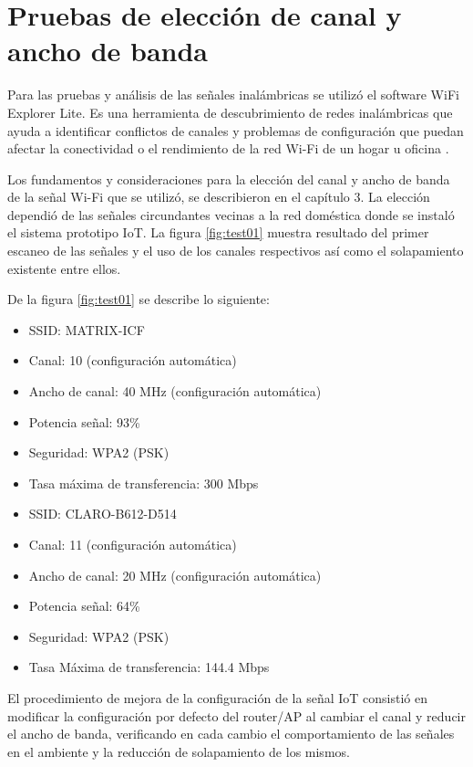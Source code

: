 \section{Pruebas de elección de canal y ancho de banda}
Para las pruebas y análisis de las señales inalámbricas se utilizó el software WiFi Explorer Lite. Es una herramienta de descubrimiento de redes inalámbricas que ayuda a identificar conflictos de canales y problemas de configuración que puedan afectar la conectividad o el rendimiento de la red Wi-Fi de un hogar u oficina \citep{WEBSITE:24}. 

Los fundamentos y consideraciones para la elección del canal y ancho de banda de la señal Wi-Fi que se utilizó, se describieron en el capítulo 3. La elección dependió de las señales circundantes vecinas a la red doméstica donde se instaló el sistema prototipo IoT. La figura \ref{fig:test01} muestra resultado del primer escaneo de las señales y el uso de los canales respectivos así como el solapamiento existente entre ellos. 

De la figura \ref{fig:test01} se describe lo siguiente:

\begin{itemize}
\item SSID: MATRIX-ICF
\item Canal: 10 (configuración automática)
\item Ancho de canal: 40 MHz (configuración automática)
\item Potencia señal: 93\%
\item Seguridad:  WPA2 (PSK)
\item Tasa máxima de transferencia: 300 Mbps
\end{itemize}


\begin{itemize} 
\item SSID: CLARO-B612-D514
\item Canal: 11 (configuración automática)
\item Ancho de canal: 20 MHz (configuración automática)
\item Potencia señal: 64\%
\item Seguridad: WPA2 (PSK)
\item Tasa Máxima de transferencia: 144.4 Mbps
\end{itemize}

El procedimiento de mejora de la configuración de la señal IoT consistió en modificar la configuración por defecto del router/AP al cambiar el canal y reducir el ancho de banda, verificando en cada cambio el comportamiento de las señales en el ambiente y la reducción de solapamiento de los mismos.

